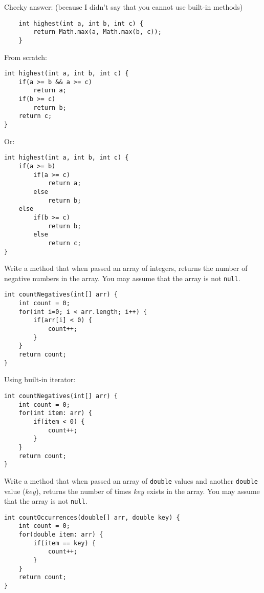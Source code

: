 \documentclass[11pt]{exam}
\begin{document}
\begin{questions}
\begin{solution}
Cheeky answer: (because I didn't say that you cannot use built-in methods)
\begin{lstlisting}
	int highest(int a, int b, int c) {
		return Math.max(a, Math.max(b, c));
	}
\end{lstlisting}	

From scratch:
\begin{lstlisting}
int highest(int a, int b, int c) {
	if(a >= b && a >= c)
		return a;
	if(b >= c)
		return b;
	return c;
}
\end{lstlisting}	

Or:

\begin{lstlisting}
int highest(int a, int b, int c) {
	if(a >= b)
		if(a >= c)
			return a;
		else
			return b;
	else
		if(b >= c)
			return b;
		else
			return c;
}
\end{lstlisting}	
\end{solution}


\question Write a method that when passed an array of integers, returns the number of negative numbers in the array. You may assume that the array is not \texttt{null}.

\begin{solution}
\begin{lstlisting}
int countNegatives(int[] arr) {
	int count = 0;
	for(int i=0; i < arr.length; i++) {
		if(arr[i] < 0) {
			count++;
		}
	}
	return count;
}
\end{lstlisting}	

Using built-in iterator:
\begin{lstlisting}
int countNegatives(int[] arr) {
	int count = 0;
	for(int item: arr) {
		if(item < 0) {
			count++;
		}
	}
	return count;
}
\end{lstlisting}	
\end{solution}

\question Write a method that when passed an array of \texttt{double} values and another \texttt{double} value ($key$), returns the number of times $key$ exists in the array. You may assume that the array is not \texttt{null}.

\begin{solution}
\begin{lstlisting}
int countOccurrences(double[] arr, double key) {
	int count = 0;
	for(double item: arr) {
		if(item == key) {
			count++;
		}
	}
	return count;
}
\end{lstlisting}	
\end{solution}


\end{questions}
\end{document}
